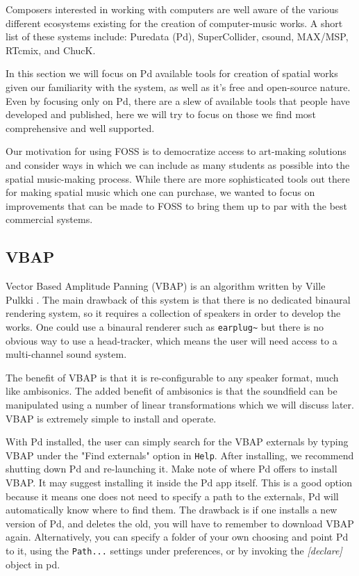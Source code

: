 Composers interested in working with computers are well aware of the various different ecosystems existing for the creation of computer-music works. A short list of these systems include: Puredata (Pd), SuperCollider, csound, MAX/MSP, RTcmix, and ChucK. 

In this section we will focus on Pd available tools for creation of spatial works given our familiarity with the system, as well as it's free and open-source nature. Even by focusing only on Pd, there are a slew of available tools that people have developed and published, here we will try to focus on those we find most comprehensive and well supported. 

Our motivation for using FOSS is to democratize access to art-making solutions and consider ways in which we can include as many students as possible into the spatial music-making process. While there are more sophisticated tools out there for making spatial music which one can purchase, we wanted to focus on improvements that can be made to FOSS to bring them up to par with the best commercial systems. 

\subsection{VBAP} 
Vector Based Amplitude Panning (VBAP) is an algorithm written by Ville Pulkki \cite{pulkki1997virtual}. The main drawback of this system is that there is no dedicated binaural rendering system, so it requires a collection of speakers in order to develop the works. One could use a binaural renderer such as \texttt{earplug\~} but there is no obvious way to use a head-tracker, which means the user will need access to a multi-channel sound system. 

The benefit of VBAP is that it is re-configurable to any speaker format, much like ambisonics. The added benefit of ambisonics is that the soundfield can be manipulated using a number of linear transformations which we will discuss later. VBAP is extremely simple to install and operate. 

With Pd installed, the user can simply search for the VBAP externals by typing VBAP under the "Find externals" option in \texttt{Help}. After installing, we recommend shutting down Pd and re-launching it. Make note of where Pd offers to install VBAP. It may suggest installing it inside the Pd app itself. This is a good option because it means one does not need to specify a path to the externals, Pd will automatically know where to find them. The drawback is if one installs a new version of Pd, and deletes the old, you will have to remember to download VBAP again. Alternatively, you can specify a folder of your own choosing and point Pd to it, using the \texttt{Path...} settings under preferences, or by invoking the \textit{[declare]} object in pd.

